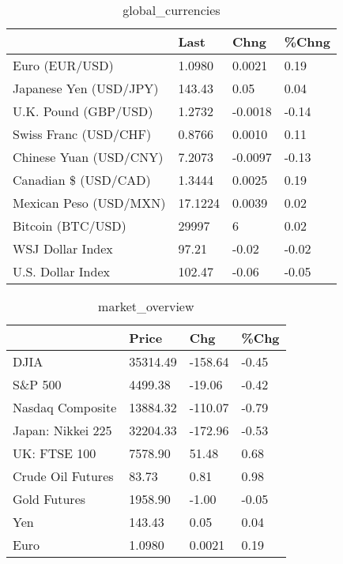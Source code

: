 \documentclass{article}%
\begin{document}
%


\begin{table}[htbp]%
\caption{global\_currencies}%
\centering%
\begin{adjustbox}{width=1\textwidth}%
\begin{tabular}{llll}
\toprule
                       &    Last &    Chng & \%Chng \\
\midrule
        Euro (EUR/USD) &  1.0980 &  0.0021 &  0.19 \\
Japanese Yen (USD/JPY) &  143.43 &    0.05 &  0.04 \\
  U.K. Pound (GBP/USD) &  1.2732 & -0.0018 & -0.14 \\
 Swiss Franc (USD/CHF) &  0.8766 &  0.0010 &  0.11 \\
Chinese Yuan (USD/CNY) &  7.2073 & -0.0097 & -0.13 \\
  Canadian \$ (USD/CAD) &  1.3444 &  0.0025 &  0.19 \\
Mexican Peso (USD/MXN) & 17.1224 &  0.0039 &  0.02 \\
     Bitcoin (BTC/USD) &   29997 &       6 &  0.02 \\
      WSJ Dollar Index &   97.21 &   -0.02 & -0.02 \\
     U.S. Dollar Index &  102.47 &   -0.06 & -0.05 \\
\bottomrule
\end{tabular}
%
\end{adjustbox}%
\end{table}

%


\begin{table}[htbp]%
\caption{market\_overview}%
\centering%
\begin{adjustbox}{width=1\textwidth}%
\begin{tabular}{llll}
\toprule
                  &    Price &     Chg &  \%Chg \\
\midrule
             DJIA & 35314.49 & -158.64 & -0.45 \\
          S\&P 500 &  4499.38 &  -19.06 & -0.42 \\
 Nasdaq Composite & 13884.32 & -110.07 & -0.79 \\
Japan: Nikkei 225 & 32204.33 & -172.96 & -0.53 \\
     UK: FTSE 100 &  7578.90 &   51.48 &  0.68 \\
Crude Oil Futures &    83.73 &    0.81 &  0.98 \\
     Gold Futures &  1958.90 &   -1.00 & -0.05 \\
              Yen &   143.43 &    0.05 &  0.04 \\
             Euro &   1.0980 &  0.0021 &  0.19 \\
\bottomrule
\end{tabular}
%
\end{adjustbox}%
\end{table}

%
\end{document}
